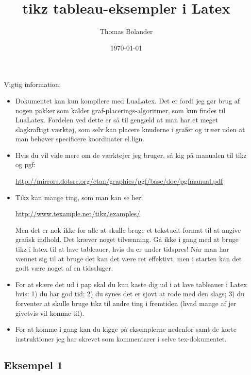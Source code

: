 \documentclass[11pt,a4paper]{article}
\title{tikz tableau-eksempler i Latex}
\author{Thomas Bolander}
\date{\today}
\begin{document}
\maketitle

Vigtig information:
\begin{itemize}
  \item Dokumentet kan kun kompilere med LuaLatex. Det er fordi jeg gør brug af nogen pakker som kalder graf-placerings-algoritmer, som kun findes til LuaLatex. Fordelen ved dette er så til gengæld at man har et meget slagkraftigt værktøj, som selv kan placere knuderne i grafer og træer uden at man behøver specificere koordinater el.lign.
  \item Hvis du vil vide mere om de værktøjer jeg bruger, så kig på manualen til tikz og pgf: 
  \begin{center} \color{blue} \footnotesize
  \url{http://mirrors.dotsrc.org/ctan/graphics/pgf/base/doc/pgfmanual.pdf}
  \end{center}
  \item Tikz kan mange ting, som man kan se her:
  \begin{center} \color{blue} \footnotesize
  \url{http://www.texample.net/tikz/examples/}
  \end{center}
   Men det er nok ikke for alle at skulle bruge et tekstuelt format til at angive grafisk indhold. Det kræver noget tilvænning. Gå ikke i gang med at bruge tikz i latex til at lave tableauer, hvis du er under tidspres! Når man har vænnet sig til at bruge det kan det være ret effektivt, men i starten kan det godt være noget af en tidssluger.
  \item For at skære det ud i pap skal du kun kaste dig ud i at lave tableauer i Latex hvis: 1) du har god tid; 2) du synes det er sjovt at rode med den slags; 3) du forventer at skulle bruge tikz til andre ting i fremtiden (hvad mange af jer givetvis vil komme til).
  \item For at komme i gang kan du kigge på eksemplerne nedenfor samt de korte instruktioner jeg har skrevet som kommentarer i selve tex-dokumentet. 
\end{itemize}


\subsection*{Eksempel 1}
\end{document}
